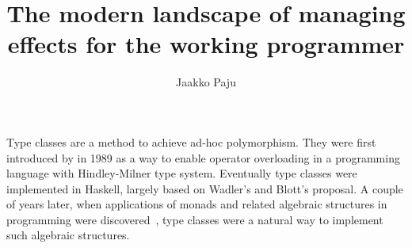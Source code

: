 \documentclass[language=english,version=final,mainfont=none,minted=true]{utuftthesis}
\providecommand{\algorithmname}{Algoritmi}
\begin{document}
\title{The modern landscape of managing effects for the working programmer}
\author{Jaakko Paju}

\newcommand{\blankpage}{
  \thispagestyle{empty}
  \newpage
  \mbox{}
  \newpage
}

\blankpage
\maketitle



\tableofcontents %


\renewcommand{\algorithmname}{\listingscaption}

\newcommand{\inlinecode}[1]{\texttt{#1}}
\newcommand{\inlinescala}[1]{\texttt{#1}}
\newcommand{\inlinehaskell}[1]{\texttt{#1}}

\newcommand{\titlecite}[1]{\citetitle{#1}~\cite{#1}}








\printbibliography

\begin{comment}
Important! Create the appendix chapters with command \textbackslash appchapter\{some
name\} instead of \textbackslash chapter\{some name\} for the automagic
page counting to work!
\end{comment}



\label{typeclasses}
Type classes are a method to achieve ad-hoc polymorphism. They were first introduced by \textcite{ad-hoc-less-ad-hoc} in 1989 as a way to enable operator overloading in a programming language with Hindley-Milner type system. Eventually type classes were implemented in Haskell, largely based on Wadler's and Blott's proposal. A couple of years later, when applications of monads and related algebraic structures in programming were discovered~\cite{comp-lambda-monads}, type classes were a natural way to implement such algebraic structures.
\end{document}
